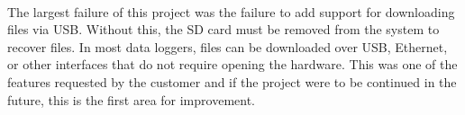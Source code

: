 \paragraph{}
The largest failure of this project was the failure to add support for downloading files via USB.
Without this, the SD card must be removed from the system to recover files.
In most data loggers, files can be downloaded over USB, Ethernet, or other interfaces that do not require opening the hardware.
This was one of the features requested by the customer and if the project were to be continued in the future, this is the first area for improvement.